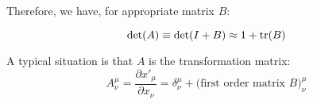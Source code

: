     Therefore, we have, for appropriate matrix $B$:
    \begin{thm}
    \begin{equation}
        \det(A) \equiv \det(I+B) \approx 1+\tr(B)
    \end{equation}
    \end{thm}
    
    A typical situation is that $A$ is the transformation matrix:
    \begin{equation}
        A^\mu_\nu = \frac{\partial x'_\mu}{\partial x_\nu} 
        = \delta^\mu_\nu + \text{(first order matrix $B$)}^\mu_\nu
    \end{equation}
